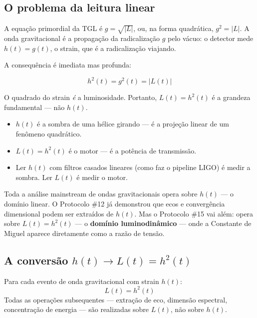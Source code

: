 \documentclass[12pt,a4paper,twoside]{article}
\begin{document}
\subsection{O problema da leitura linear}

A equação primordial da TGL é $g = \sqrt{|L|}$, ou, na forma quadrática, $g^2 = |L|$. A onda gravitacional é a propagação da radicalização $g$ pelo vácuo: o detector mede $h(t) = g(t)$, o strain, que é a radicalização viajando.

A consequência é imediata mas profunda:
%
\begin{equationbox}[title={O domínio luminodinâmico}]
\begin{equation}
h^2(t) = g^2(t) = |L(t)|
\label{eq:luminodinamico}
\end{equation}
\end{equationbox}
%
O quadrado do strain \textit{é} a luminosidade. Portanto, $L(t) = h^2(t)$ é a grandeza fundamental --- não $h(t)$.

\begin{factorbox}[title={A analogia}]
\begin{itemize}[nosep]
\item $h(t)$ é a sombra de uma hélice girando --- é a projeção linear de um fenômeno quadrático.
\item $L(t) = h^2(t)$ é o motor --- é a potência de transmissão.
\item Ler $h(t)$ com filtros casados lineares (como faz o pipeline LIGO) é medir a sombra. Ler $L(t)$ é medir o motor.
\end{itemize}
\end{factorbox}

\noindent Toda a análise mainstream de ondas gravitacionais opera sobre $h(t)$ --- o domínio linear. O Protocolo \#12 \cite{Miguel2026LastString} já demonstrou que ecos e convergência dimensional podem ser extraídos de $h(t)$. Mas o Protocolo \#15 vai além: opera sobre $L(t) = h^2(t)$ --- o \textbf{domínio luminodinâmico} --- onde a Constante de Miguel aparece diretamente como a razão de tensão.


\subsection{A conversão $h(t) \to L(t) = h^2(t)$}

Para cada evento de onda gravitacional com strain $h(t)$:
%
\begin{equation}
L(t) = h^2(t)
\end{equation}
%
Todas as operações subsequentes --- extração de eco, dimensão espectral, concentração de energia --- são realizadas sobre $L(t)$, não sobre $h(t)$.
\end{document}
